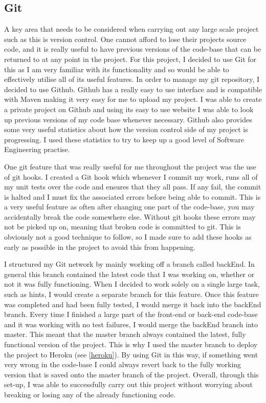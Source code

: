 \subsection{Git}

A key area that needs to be considered when carrying out any large scale project such as this is version control. One cannot afford to lose their projects source code, and it is really useful to have previous versions of the code-base that can be returned to at any point in the project. For this project, I decided to use Git for this as I am very familiar with its functionality and so would be able to effectively utilise all of its useful features. In order to manage my git repository, I decided to use Github. Github has a really easy to use interface and is compatible with Maven making it very easy for me to upload my project. I was able to create a private project on Github and using its easy to use website I was able to look up previous versions of my code base whenever necessary. Github also provides some very useful statistics about how the version control side of my project is progressing. I used these statistics to try to keep up a good level of Software Engineering practise.

One git feature that was really useful for me throughout the project was the use of git hooks. I created a Git hook which whenever I commit my work, runs all of my unit tests over the code and ensures that they all pass. If any fail, the commit is halted and I must fix the associated errors before being able to commit. This is a very useful feature as often after changing one part of the code-base, you may accidentally break the code somewhere else. Without git hooks these errors may not be picked up on, meaning that broken code is committed to git.  This is obviously not a good technique to follow, so I made sure to add these hooks as early as possible in the project to avoid this from happening.

I structured my Git network by mainly working off a branch called backEnd. In general this branch contained the latest code that I was working on, whether or not it was fully functioning. When I decided to work solely on a single large task, such as hints, I would create a separate branch for this feature. Once this feature was completed and had been fully tested, I would merge it back into the backEnd branch. Every time I finished a large part of the front-end or back-end code-base and it was working with no test failures, I would merge the backEnd branch into master. This meant that the master branch always contained the latest, fully functional version of the project. This is why I used the master branch to deploy the project to Heroku (see \ref{heroku}). By using Git in this way,  if something went very wrong in the code-base I could always revert back to the fully working version that is saved onto the master branch of the project. Overall, through this set-up, I was able to successfully carry out this project without worrying about breaking or losing any of the already functioning code.

